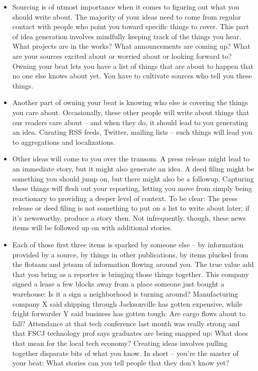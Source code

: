 \documentclass[
  11pt,
  american,
  letterpaperpaper,
  extrafontsizes,onecolumn,openright
  ]{memoir}
\providecommand{\tightlist}{%
  \setlength{\itemsep}{0pt}\setlength{\parskip}{0pt}}
\begin{document}
\begin{itemize}
\tightlist
\item
  Sourcing is of utmost importance when it comes to figuring out what you should write about. The majority of your ideas need to come from regular contact with people who point you toward specific things to cover. This part of idea generation involves mindfully keeping track of the things you hear. What projects are in the works? What announcements are coming up? What are your sources excited about or worried about or looking forward to? Owning your beat lets you have a list of things that are about to happen that no one else knows about yet. You have to cultivate sources who tell you these things.
\item
  Another part of owning your beat is knowing who else is covering the things you care about. Occasionally, these other people will write about things that our readers care about -- and when they do, it should lead to you generating an idea. Curating RSS feeds, Twitter, mailing lists -- such things will lead you to aggregations and localizations.
\item
  Other ideas will come to you over the transom. A press release might lead to an immediate story, but it might also generate an idea. A deed filing might be something you should jump on, but there might also be a followup. Capturing these things will flesh out your reporting, letting you move from simply being reactionary to providing a deeper level of context. To be clear: The press release or deed filing is not something to put on a list to write about later; if it's newsworthy, produce a story then. Not infrequently, though, these news items will be followed up on with additional stories.
\item
  Each of those first three items is sparked by someone else -- by information provided by a source, by things in other publications, by items plucked from the flotsam and jetsam of information flowing around you. The true value add that you bring as a reporter is bringing those things together. This company signed a lease a few blocks away from a place someone just bought a warehouse: Is it a sign a neighborhood is turning around? Manufacturing company X said shipping through Jacksonville has gotten expensive, while fright forwarder Y said business has gotten tough: Are cargo flows about to fall? Attendance at that tech conference last month was really strong and that FSCJ technology prof says graduates are being snapped up: What does that mean for the local tech economy? Creating ideas involves pulling together disparate bits of what you know. In short -- you're the master of your beat: What stories can you tell people that they don't know yet?
\end{itemize}
\end{document}
